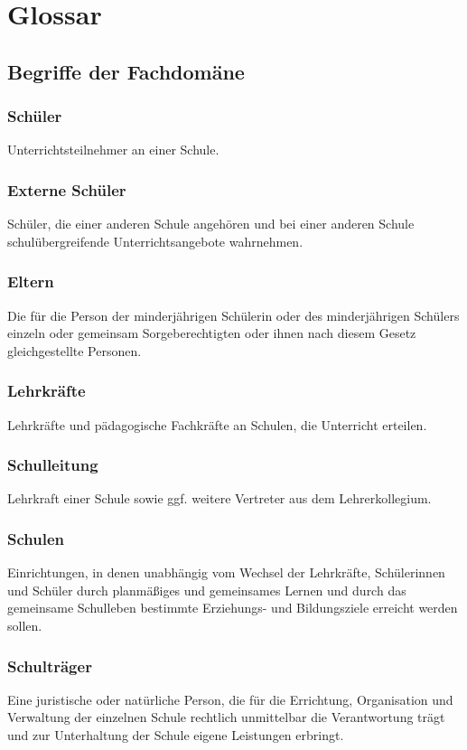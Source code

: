 \section{Glossar}
\label{glossary}

\subsection{Begriffe der Fachdomäne}

\subsubsection*{Schüler}
Unterrichtsteilnehmer an einer Schule.

\subsubsection*{Externe Schüler}
Schüler, die einer anderen Schule angehören und bei einer anderen Schule schulübergreifende Unterrichtsangebote wahrnehmen.

\subsubsection*{Eltern}
Die für die Person der minderjährigen Schülerin oder des minderjährigen Schülers einzeln oder gemeinsam Sorgeberechtigten oder ihnen nach diesem Gesetz gleichgestellte Personen.

\subsubsection*{Lehrkräfte}
Lehrkräfte und pädagogische Fachkräfte an Schulen, die Unterricht erteilen.

\subsubsection*{Schulleitung}
Lehrkraft einer Schule sowie ggf. weitere Vertreter aus dem Lehrerkollegium.

\subsubsection*{Schulen}
Einrichtungen, in denen unabhängig vom Wechsel der Lehrkräfte, Schülerinnen und Schüler durch planmäßiges und gemeinsames Lernen und durch das gemeinsame Schulleben bestimmte Erziehungs- und Bildungsziele erreicht werden sollen.

\subsubsection*{Schulträger}
Eine juristische oder natürliche Person, die für die Errichtung, Organisation und Verwaltung der einzelnen Schule rechtlich unmittelbar die Verantwortung trägt und zur Unterhaltung der Schule eigene Leistungen erbringt.

